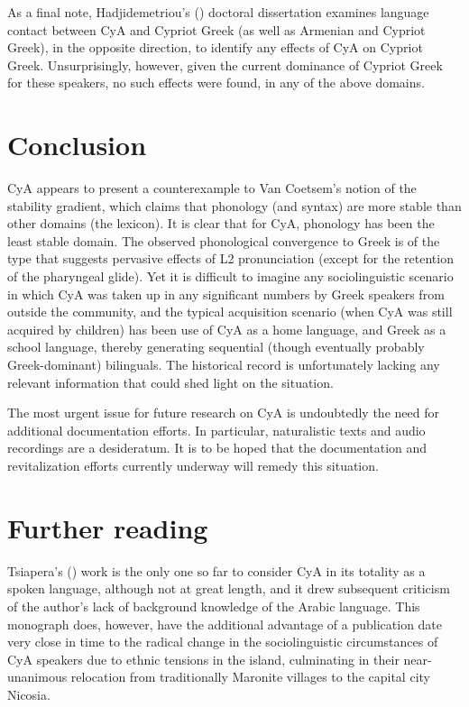 \documentclass[output=paper]{langsci/langscibook}
\begin{document}
As a final note, Hadjidemetriou's (\citeyear{Hadjidemetriou2009}) doctoral dissertation examines language contact between CyA and Cypriot Greek (as well as Armenian and Cypriot Greek), in the opposite direction, to identify any effects of CyA on Cypriot Greek. Unsurprisingly, however, given the current dominance of Cypriot Greek for these speakers, no such effects were found, in any of the above domains. 

\section{Conclusion}

CyA appears to present a counterexample to Van Coetsem’s notion of the stability gradient, which claims that phonology (and syntax) are more stable than other domains (the lexicon). It is clear that for CyA, phonology has been the least stable domain. The observed phonological convergence to Greek is of the type that suggests pervasive effects of L2 pronunciation (except for the retention of the pharyngeal glide). Yet it is difficult to imagine any sociolinguistic scenario in which CyA was taken up in any significant numbers by Greek speakers from outside the community, and the typical acquisition scenario (when CyA was still acquired by children) has been use of CyA as a home language, and Greek as a school language, thereby generating sequential (though eventually probably Greek-dominant) bilinguals. The historical record is unfortunately lacking any relevant information that could shed light on the situation. 

The most urgent issue for future research on CyA is undoubtedly the need for additional documentation efforts. In particular, naturalistic texts and audio recordings are a desideratum. It is to be hoped that the documentation and revitalization efforts currently underway will remedy this situation. 

\section*{Further reading}\label{FR}

Tsiapera's (\citeyear{Tsiapera1969}) work is the only one so far to consider CyA in its totality as a spoken language, although not at great length, and it drew subsequent criticism of the author’s lack of background knowledge of the Arabic language. This monograph does, however, have the additional advantage of a publication date very close in time to the radical change in the sociolinguistic circumstances of CyA speakers due to ethnic tensions in the island, culminating in their near-unanimous relocation from traditionally Maronite villages to the capital city Nicosia. 
\end{document}
